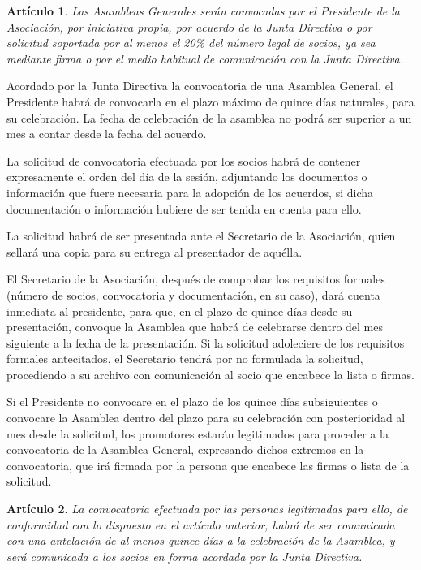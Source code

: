 \documentclass[a4paper,12pt]{article}
\theoremstyle{mystyle}		%
\newtheorem{art}{Artículo}	%
\begin{document}
\begin{onehalfspace}
\begin{art}
Las Asambleas Generales serán convocadas por el Presidente de la Asociación, por iniciativa propia, por acuerdo de la Junta Directiva o por solicitud soportada por al menos el 20\% del número legal de socios, ya sea mediante firma o por el medio habitual de comunicación con la Junta Directiva.
\end{art}

Acordado por la Junta Directiva la convocatoria de una Asamblea General, el Presidente habrá de convocarla en el plazo máximo de quince días naturales, para su celebración. La fecha de celebración de la asamblea no podrá ser superior a un mes a contar desde la fecha del acuerdo.

La solicitud de convocatoria efectuada por los socios habrá de contener expresamente el orden del día de la sesión, adjuntando los documentos o información que fuere necesaria para la adopción de los acuerdos, si dicha documentación o información hubiere de ser tenida en cuenta para ello.

La solicitud habrá de ser presentada ante el Secretario de la Asociación, quien sellará una copia para su entrega al presentador de aquélla.

El Secretario de la Asociación, después de comprobar los requisitos formales (número de socios, convocatoria y documentación, en su caso), dará cuenta inmediata al presidente, para que, en el plazo de quince días desde su presentación, convoque la Asamblea que habrá de celebrarse dentro del mes siguiente a la fecha de la presentación. Si la solicitud adoleciere de los requisitos formales antecitados, el Secretario tendrá por no formulada la solicitud, procediendo a su archivo con comunicación al socio que encabece la lista o firmas.

Si el Presidente no convocare en el plazo de los quince días subsiguientes o convocare la Asamblea dentro del plazo para su celebración con posterioridad al mes desde la solicitud, los promotores estarán legitimados para proceder a la convocatoria de la Asamblea General, expresando dichos extremos en la convocatoria, que irá firmada por la persona que encabece las firmas o lista de la solicitud.

\begin{art}
La convocatoria efectuada por las personas legitimadas para ello, de conformidad con lo dispuesto en el artículo anterior, habrá de ser comunicada con una antelación de al menos quince días a la celebración de la Asamblea, y será comunicada a los socios en forma acordada por la Junta Directiva.
\end{art}


\end{onehalfspace}
\end{document}
